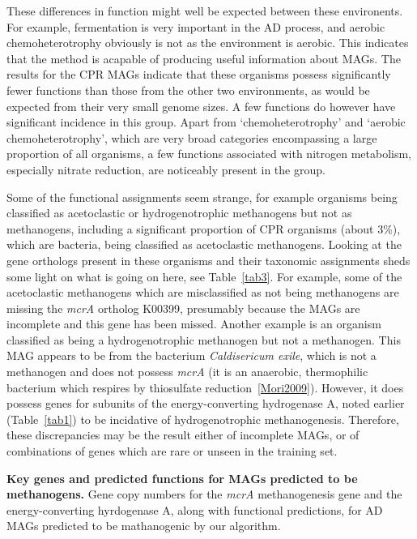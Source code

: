 \documentclass[10pt,letterpaper]{article}
\begin{document}
These differences in function might well be expected between these environents. For example, fermentation is very important in the AD process, and aerobic chemoheterotrophy obviously is not as the environment is aerobic. This indicates that the method is acapable of producing useful information about MAGs. The results for the CPR MAGs indicate that these organisms possess significantly fewer functions than those from the other two environments, as would be expected from their very small genome sizes. A few functions do however have significant incidence in this group. Apart from `chemoheterotrophy' and `aerobic chemoheterotrophy', which are very broad categories encompassing a large proportion of all organisms, a few functions associated with nitrogen metabolism, especially nitrate reduction, are noticeably present in the group.

Some of the functional assignments seem strange, for example organisms being classified as acetoclastic or hydrogenotrophic methanogens but not as methanogens, including a significant proportion of CPR organisms (about 3\%), which are bacteria, being classified as acetoclastic methanogens. Looking at the gene orthologs present in these organisms and their taxonomic assignments sheds some light on what is going on here, see Table~\ref{tab3}. For example, some of the acetoclastic methanogens which are misclassified as not being methanogens are missing the \emph{mcrA} ortholog K00399, presumably because the MAGs are incomplete and this gene has been missed. Another example is an organism classified as being a hydrogenotrophic methanogen but not a methanogen. This MAG appears to be from the bacterium \emph{Caldisericum exile}, which is not a methanogen and does not possess \emph{mcrA} (it is an anaerobic, thermophilic bacterium which respires by thiosulfate reduction~\ref{Mori2009}). However, it does possess genes for subunits of the energy-converting hydrogenase A, noted earlier (Table~\ref{tab1}) to be incidative of hydrogenotrophic methanogenesis. Therefore, these discrepancies may be the result either of incomplete MAGs, or of combinations of genes which are rare or unseen in the training set.

\begin{table}
\scriptsize
{}

\caption{{\bf Key genes and predicted functions for MAGs predicted to be methanogens.}
Gene copy numbers for the \emph{mcrA} methanogenesis gene and the energy-converting hyrdogenase A, along with functional predictions, for AD MAGs predicted to be mathanogenic by our algorithm.}\label{tab3}
\end{table}
\end{document}
